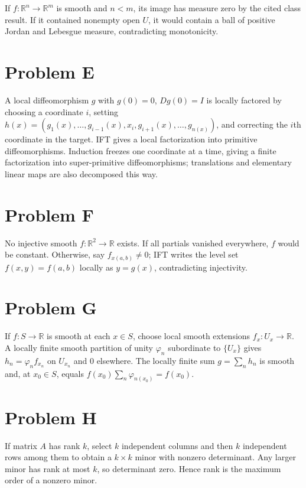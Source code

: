 If \(f:\mathbb{R}^{n}\rightarrow\mathbb{R}^{m}\) is smooth and \(n < m\), its image has measure zero by the cited class result. If it contained nonempty open \(U\), it would contain a ball of positive Jordan and Lebesgue measure, contradicting monotonicity.

\section{Problem E}

A local diffeomorphism \(g\) with \(g(0) = 0\), \(Dg(0) = I\) is locally factored by choosing a coordinate \(i\), setting \(h(x) = \left( {g_{1}(x),\ldots,g_{i - 1}(x),x_{i},g_{i + 1}(x),\ldots,g_{n{(x)}}} \right)\), and correcting the \(i\)th coordinate in the target. IFT gives a local factorization into primitive diffeomorphisms. Induction freezes one coordinate at a time, giving a finite factorization into super-primitive diffeomorphisms; translations and elementary linear maps are also decomposed this way.

\section{Problem F}

No injective smooth \(f:\mathbb{R}^{2}\rightarrow\mathbb{R}\) exists. If all partials vanished everywhere, \(f\) would be constant. Otherwise, say \(f_{x{({a,b})}} \neq 0\); IFT writes the level set \(f\left( {x,y} \right) = f\left( {a,b} \right)\) locally as \(y = g(x)\), contradicting injectivity.

\section{Problem G}

If \(f:S\rightarrow\mathbb{R}\) is smooth at each \(x \in S\), choose local smooth extensions \(f_{x}:U_{x}\rightarrow\mathbb{R}\). A locally finite smooth partition of unity \(\varphi_{n}\) subordinate to \(\{ U_{x}\}\) gives \(h_{n} = \varphi_{n}f_{x_{n}}\) on \(U_{x_{n}}\) and \(0\) elsewhere. The locally finite sum \(g = \sum_{n}h_{n}\) is smooth and, at \(x_{0} \in S\), equals \(f\left( x_{0} \right)\sum_{n}\varphi_{n{(x_{0})}} = f\left( x_{0} \right)\).

\section{Problem H}

If matrix \(A\) has rank \(k\), select \(k\) independent columns and then \(k\) independent rows among them to obtain a \(k \times k\) minor with nonzero determinant. Any larger minor has rank at most \(k\), so determinant zero. Hence rank is the maximum order of a nonzero minor.
